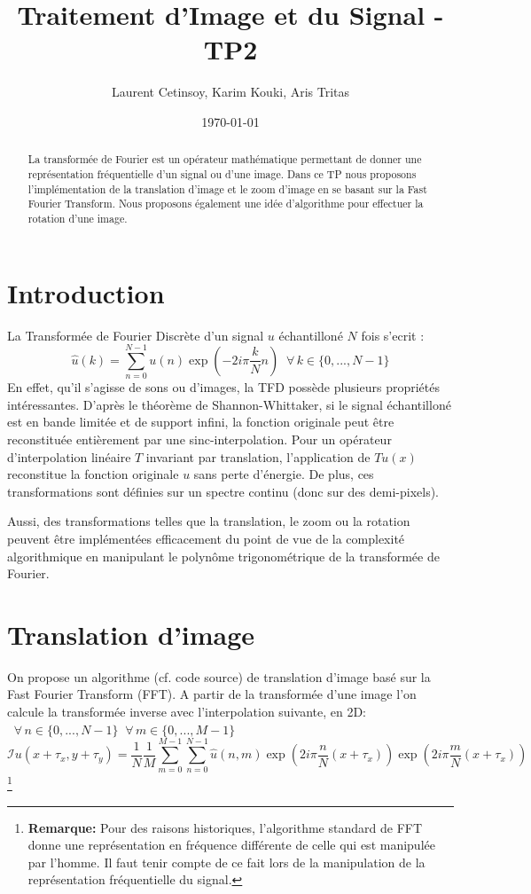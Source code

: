 \documentclass[12pt]{article}
\title{Traitement d'Image et du Signal - TP2}
\author{Laurent Cetinsoy, Karim Kouki, Aris Tritas }
\date{\today}
\begin{document}
\maketitle

\begin{abstract}
La transformée de Fourier est un opérateur mathématique permettant de donner une représentation fréquentielle d'un signal ou d'une image. 
Dans ce TP nous proposons l'implémentation de la translation d'image et le zoom d'image en se basant sur la Fast Fourier Transform. Nous proposons également une idée d'algorithme pour effectuer la rotation d'une image.
\end{abstract}

\section*{Introduction}

La Transformée de Fourier Discrète d'un signal $u$ échantilloné $N$ fois s'ecrit :
\begin{equation*}
\hat{u}(k) = \sum_{n=0}^{N-1} u(n)\exp(-2 i \pi \frac{k}{N}n) \;\; \forall \, k \in \{0, ... ,N-1\}
\end{equation*}
En effet, qu'il s'agisse de sons ou d'images, la TFD possède plusieurs propriétés intéressantes. 
D'après le théorème de Shannon-Whittaker, si le signal échantilloné est en bande limitée et de support infini, la fonction originale peut être reconstituée entièrement par une sinc-interpolation. 
Pour un opérateur d'interpolation linéaire $T$ invariant par translation, l'application de $Tu(x)$ reconstitue la fonction originale $u$ sans perte d'énergie. 
De plus, ces transformations sont définies sur un spectre continu (donc sur des demi-pixels).

Aussi, des transformations telles que la translation, le zoom ou la rotation peuvent être implémentées efficacement du point de vue de la complexité algorithmique en manipulant le polynôme trigonométrique de la transformée de Fourier. 
\newpage
\section*{Translation d'image}

On propose un algorithme (cf. code source) de translation d'image basé sur la Fast Fourier Transform (FFT). A partir de la transformée d'une image l'on calcule la transformée inverse avec l'interpolation suivante, en 2D: $\;\;\forall \, n \in \{0, ... ,N-1\}\; \; \forall \, m \in \{0, ... ,M-1\}$ 
\begin{equation*}
\mathcal{I}u(x + \tau_x, y + \tau_y) = \frac{1}{N} \frac{1}{M} \sum_{m=0}^{M-1} \sum_{n=0}^{N-1} \hat{u}(n, m)\exp(2 i \pi \frac{n}{N}(x + \tau_x)) \exp(2 i \pi \frac{m}{N}(x + \tau_x)) \;\; 
\end{equation*}
\footnote{\textbf{Remarque:} Pour des raisons historiques, l'algorithme standard de FFT donne une représentation en fréquence différente de celle qui est manipulée par l'homme. Il faut tenir compte de ce fait lors de la manipulation de la représentation fréquentielle du signal.}
\end{document}
